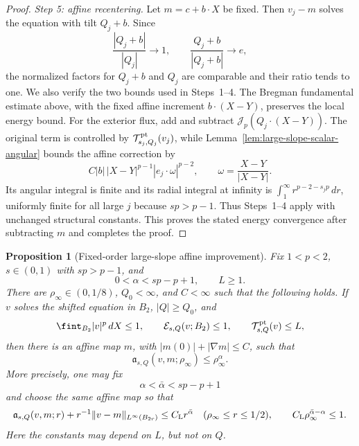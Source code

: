 \documentclass[11pt,reqno]{amsart}
\numberwithin{equation}{section}
\newcommand{\Jp}{\mathcal J_p}
\newcommand{\dd}{\,d}
\newtheorem{proposition}[theorem]{Proposition}
\theoremstyle{remark}
\begin{document}
\begin{proof}
\emph{Step 5: affine recentering.}
Let \(m=c+b\cdot X\) be fixed.  Then \(v_j-m\) solves the equation with
tilt \(Q_j+b\).  Since
\[
 \frac{|Q_j+b|}{|Q_j|}\longrightarrow1,
 \qquad \frac{Q_j+b}{|Q_j+b|}\longrightarrow e,
\]
the normalized factors for \(Q_j+b\) and \(Q_j\) are comparable and
their ratio tends to one.  We also verify the two bounds used in
Steps~1--4.  The Bregman fundamental estimate above, with the fixed
affine increment \(b\cdot(X-Y)\), preserves the local energy bound.  For
the exterior flux, add and subtract \(\Jp(Q_j\cdot(X-Y))\).  The original
term is controlled by \(\mathcal T^{\rm pt}_{s_j,Q_j}(v_j)\), while
Lemma~\ref{lem:large-slope-scalar-angular} bounds the affine correction
by
\[
 C|b|\,|X-Y|^{p-1}|e_j\cdot\omega|^{p-2},
 \qquad \omega=\frac{X-Y}{|X-Y|}.
\]
Its angular integral is finite and its radial integral at infinity is
\(\int_1^\infty r^{p-2-s_jp}\dd r\), uniformly finite for all large
\(j\) because \(sp>p-1\).  Thus Steps~1--4 apply with unchanged
structural constants.  This proves the stated energy convergence after
subtracting \(m\) and completes the proof.
\end{proof}

\begin{proposition}[Fixed-order large-slope affine improvement]
\label{prop:large-slope-affine-improvement}
Fix \(1<p<2\), \(s\in(0,1)\) with \(sp>p-1\), and
\[
 0<\alpha<sp-p+1,\qquad L\ge1.
\]
There are \(\rho_\infty\in(0,1/8)\), \(Q_0<\infty\), and \(C<\infty\)
such that the following holds.  If \(v\) solves the shifted equation in
\(B_2\), \(|Q|\ge Q_0\), and
\[
 \fint_{B_2}|v|^p\dd X\le1,\qquad
 \mathcal E_{s,Q}(v;B_2)\le1,\qquad
 \mathcal T^{\rm pt}_{s,Q}(v)\le L,
\]
then there is an affine map \(m\), with \(|m(0)|+|\nabla m|\le C\),
such that
\begin{equation}
 \mathfrak a_{s,Q}(v,m;\rho_\infty)\le\rho_\infty^\alpha.
 \label{eq:large-slope-affine-improvement}
\end{equation}
More precisely, one may fix
\begin{equation}
 \alpha<\bar\alpha<sp-p+1
 \label{eq:large-slope-intermediate-exponent}
\end{equation}
and choose the same affine map so that
\begin{equation}
 \mathfrak a_{s,Q}(v,m;r)
 +r^{-1}\|v-m\|_{L^\infty(B_{2r})}
 \le C_{\rm L}r^{\bar\alpha}
 \quad(\rho_\infty\le r\le1/2),
 \qquad
 C_{\rm L}\rho_\infty^{\bar\alpha-\alpha}\le1.
 \label{eq:large-slope-intermediate-block}
\end{equation}
Here the constants may depend on \(L\), but not on \(Q\).
\end{proposition}
\end{document}
